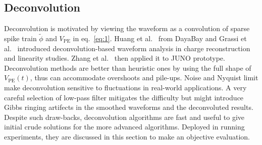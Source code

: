 \subsection{Deconvolution}
\label{sec:deconv}
Deconvolution is motivated by viewing the waveform as a convolution of sparse spike train $\tilde{\phi}$ and $V_\mathrm{PE}$ in eq.~\eqref{eq:1}.  Huang et al.~\cite{huang_flash_2018} from DayaBay and Grassi et al.~\cite{grassi_charge_2018} introduced deconvolution-based waveform analysis in charge reconstruction and linearity studies.  Zhang et al.~\cite{zhang_comparison_2019} then applied it to JUNO prototype.  Deconvolution methods are better than heuristic ones by using the full shape of $V_\mathrm{PE}(t)$, thus can accommodate overshoots and pile-ups.  Noise and Nyquist limit make deconvolution sensitive to fluctuations in real-world applications.  A very careful selection of low-pass filter mitigates the difficulty but might introduce Gibbs ringing artifects in the smoothed waveforms and the deconvoluted results. Despite such draw-backs, deconvolution algorithms are fast and useful to give initial crude solutions for the more advanced algorithms.  Deployed in running experiments, they are discussed in this section to make an objective evaluation. 

